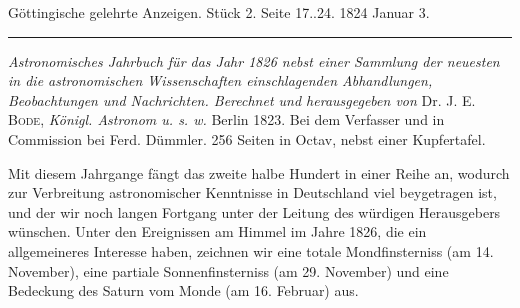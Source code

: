 \clearpage
{}
\hypertarget{native-635-lower}{}
\begin{center}\small Göttingische gelehrte Anzeigen. Stück 2. Seite 17..24. 1824 Januar 3.\\[3pt]\rule{.72\linewidth}{.3pt}\end{center}

\emph{Astronomisches Jahrbuch für das Jahr \textup{1826} nebst einer Sammlung der neuesten in die astronomischen Wissenschaften einschlagenden Abhandlungen, Beobachtungen und Nachrichten. Berechnet und herausgegeben von} Dr. J. E. \textsc{Bode}, \emph{Königl. Astronom u. s. w.} Berlin 1823. Bei dem Verfasser und in Commission bei Ferd. Dümmler. 256 Seiten in Octav, nebst einer Kupfertafel.

Mit diesem Jahrgange fängt das zweite halbe Hundert in einer Reihe an, wodurch zur Verbreitung astronomischer Kenntnisse in Deutschland viel beygetragen ist, und der wir noch langen Fortgang  unter der Leitung des würdigen Herausgebers wünschen. Unter den Ereignissen am Himmel im Jahre 1826, die ein allgemeineres Interesse haben, zeichnen wir eine totale Mondfinsterniss (am 14. November), eine partiale Sonnenfinsterniss (am 29. November) und eine Bedeckung des Saturn vom Monde (am 16. Februar) aus.

